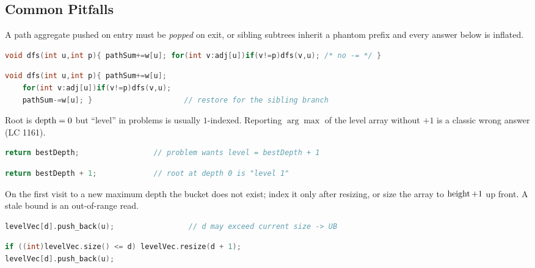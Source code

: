 \subsection{Common Pitfalls}\label{sec:c24-path-pitfalls}

\begin{warningbox}
A path aggregate pushed on entry must be \emph{popped} on exit, or sibling subtrees inherit a
phantom prefix and every answer below is inflated.
\end{warningbox}
\begin{lstlisting}[caption={\textcolor{warningred}{WRONG}: push on entry, never retract}, language=C++, basicstyle=\ttfamily\small]
void dfs(int u,int p){ pathSum+=w[u]; for(int v:adj[u])if(v!=p)dfs(v,u); /* no -= */ }
\end{lstlisting}
\begin{lstlisting}[caption={\textcolor{successgreen}{RIGHT}: subtract exactly what you added}, language=C++, basicstyle=\ttfamily\small]
void dfs(int u,int p){ pathSum+=w[u];
    for(int v:adj[u])if(v!=p)dfs(v,u);
    pathSum-=w[u]; }                     // restore for the sibling branch
\end{lstlisting}

\begin{warningbox}
Root is $\operatorname{depth}=0$ but ``level'' in problems is usually $1$-indexed. Reporting
$\arg\max$ of the level array without $+1$ is a classic wrong answer (LC 1161).
\end{warningbox}
\begin{lstlisting}[caption={\textcolor{warningred}{WRONG}: returns a $0$-based depth as the level}, language=C++, basicstyle=\ttfamily\small]
return bestDepth;                 // problem wants level = bestDepth + 1
\end{lstlisting}
\begin{lstlisting}[caption={\textcolor{successgreen}{RIGHT}: shift to the requested indexing}, language=C++, basicstyle=\ttfamily\small]
return bestDepth + 1;             // root at depth 0 is "level 1"
\end{lstlisting}

\begin{warningbox}
On the first visit to a new maximum depth the bucket does not exist; index it only after
resizing, or size the array to $\operatorname{height}{+}1$ up front. A stale bound is an out-of-range read.
\end{warningbox}
\begin{lstlisting}[caption={\textcolor{warningred}{WRONG}: push into a bucket that may not exist}, language=C++, basicstyle=\ttfamily\small]
levelVec[d].push_back(u);                 // d may exceed current size -> UB
\end{lstlisting}
\begin{lstlisting}[caption={\textcolor{successgreen}{RIGHT}: grow the vector to depth first}, language=C++, basicstyle=\ttfamily\small]
if ((int)levelVec.size() <= d) levelVec.resize(d + 1);
levelVec[d].push_back(u);
\end{lstlisting}

